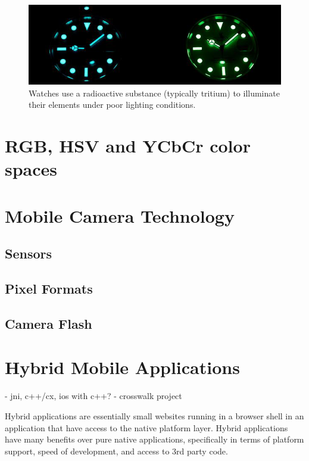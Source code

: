 \documentclass[thesis.tex]{subfiles}
\begin{document}
\begin{figure}[hb]
\centering \includegraphics[width=12.9cm]{images/photoluminescence_example}
\caption{Watches use a radioactive substance (typically tritium) to illuminate their elements under poor lighting conditions.\label{figure:photoluminescence_example}}
\end{figure}

\section{RGB, HSV and YCbCr color spaces}
\label{section:rgbhsv}


\section{Mobile Camera Technology}

\subsection{Sensors}
\subsection{Pixel Formats}
\subsection{Camera Flash}

\section{Hybrid Mobile Applications}
- jni, c++/cx, ios with c++?
- crosswalk project

Hybrid applications are essentially small websites running in a browser shell in an application that have access to the native platform layer. Hybrid applications have many benefits over pure native applications, specifically in terms of platform support, speed of development, and access to 3rd party code.
\end{document}
